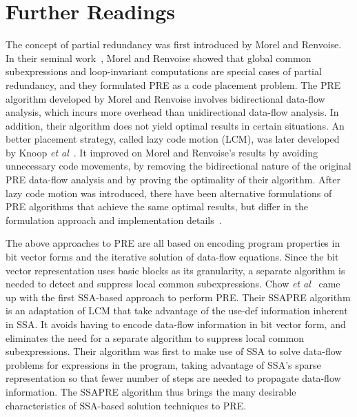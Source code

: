 \section{Further Readings}
\label{sec:ssapre:related}
The concept of partial redundancy was first introduced by Morel and Renvoise. 
In their seminal work~\cite{MR79}, Morel and Renvoise showed that global common subexpressions and loop-invariant computations are special cases of partial redundancy, and they formulated PRE as a code placement problem. 
The PRE algorithm developed by Morel and Renvoise involves bidirectional data-flow analysis, which incurs more overhead than unidirectional data-flow analysis. 
In addition, their algorithm does not yield optimal results in certain situations. 
An better placement strategy, called lazy code motion (LCM), was later developed by Knoop {\it et al}~\cite{Knoop92,Knoop94}. 
It improved on Morel and Renvoise's results by avoiding unnecessary code movements, by removing the bidirectional nature of the original PRE data-flow analysis and by proving the optimality of their algorithm. 
After lazy code motion was introduced, there have been alternative formulations of PRE algorithms that achieve the same optimal results, but differ in the formulation approach and implementation details~\cite{DS93,Dhamdhere02,Paleri03,XueKnoop06}.

The above approaches to PRE are all based on encoding program properties in bit vector forms and the iterative solution of data-flow equations. 
Since the bit vector representation uses basic blocks as its granularity, a separate algorithm is needed to detect and suppress local common subexpressions. 
Chow {\it et al}~\cite{Chow97,Kennedy99} came up with the first SSA-based approach to perform PRE. 
Their SSAPRE algorithm is an adaptation of LCM that take advantage of the use-def information inherent in SSA. 
It avoids having to encode data-flow information in bit vector form, and eliminates the need for a separate algorithm to suppress local common subexpressions. 
Their algorithm was first to make use of SSA to solve data-flow problems for expressions in the program, taking advantage of SSA's sparse representation so that fewer number of steps are needed to propagate data-flow information. 
The SSAPRE algorithm thus brings the many desirable characteristics of SSA-based solution techniques to PRE.

